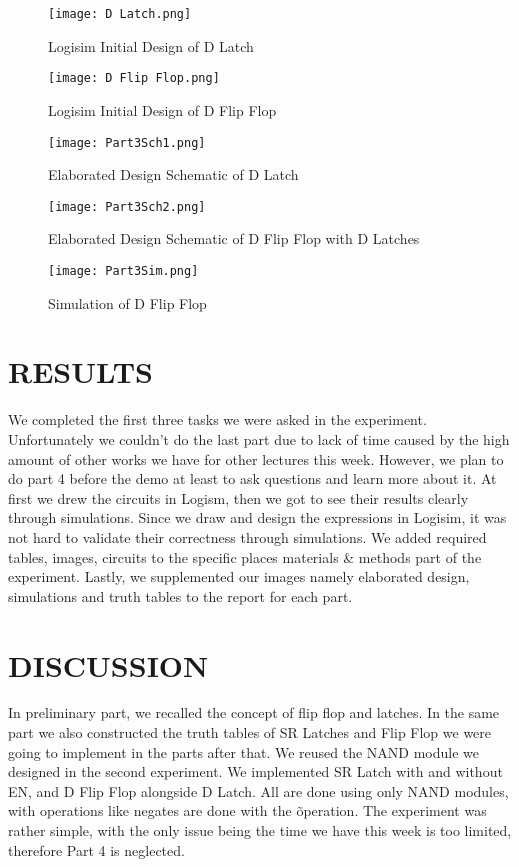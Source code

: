 \documentclass[pdftex,12pt,a4paper]{article}
\begin{document}
\begin{figure}[ht]
	\centering
	\texttt{[image: D Latch.png]}
	\caption{Logisim Initial Design of D Latch}
	\label{fig1}
\end{figure}

\begin{figure}[ht]
	\centering
	\texttt{[image: D Flip Flop.png]}
	\caption{Logisim Initial Design of D Flip Flop}
	\label{fig1}
\end{figure}

\begin{figure}[ht]
	\centering
	\texttt{[image: Part3Sch1.png]}
	\caption{Elaborated Design Schematic of D Latch}
	\label{fig1}
\end{figure}

\begin{figure}[ht]
	\centering
	\texttt{[image: Part3Sch2.png]}
	\caption{Elaborated Design Schematic of D Flip Flop with D Latches}
	\label{fig1}
\end{figure}

\begin{figure}[ht]
	\centering
	\texttt{[image: Part3Sim.png]}
	\caption{Simulation of D Flip Flop}
	\label{fig1}
\end{figure}


\section{RESULTS }
We completed the first three tasks we were asked in the experiment. Unfortunately we couldn't do the last part due to lack of time caused by the high amount of other works we have for other lectures this week. However, we plan to do part 4 before the demo at least to ask questions and learn more about it. At first we drew the circuits in Logism, then we got to see their results clearly through simulations. Since we draw and design the expressions in Logisim, it was not hard to validate their correctness through simulations. We added required tables, images, circuits to the specific places materials & methods part of the experiment. Lastly, we supplemented our images namely elaborated design, simulations and truth tables to the report for each part.


\section{DISCUSSION }
In preliminary part, we recalled the concept of flip flop and latches. In the same part we also constructed the truth tables of SR Latches and Flip Flop we were going to implement in the parts after that. We reused the NAND module we designed in the second experiment. We implemented SR Latch with and without EN, and D Flip Flop alongside D Latch. All are done using only NAND modules, with operations like negates are done with the \~ operation. The experiment was rather simple, with the only issue being the time we have this week is too limited, therefore Part 4 is neglected. 
\end{document}

